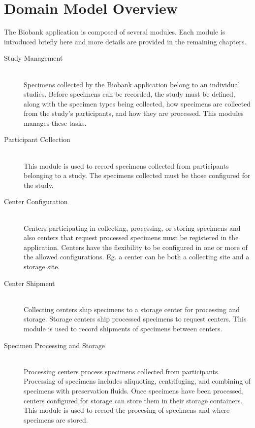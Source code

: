 \chapter{Domain Model Overview}

The Biobank application is composed of several modules. Each module is
introduced briefly here and more details are provided in the remaining
chapters.

\begin{description}

  \item[Study Management] \hfill \\ Specimens collected by the Biobank
    application belong to an individual studies. Before specimens can be
    recorded, the study must be defined, along with the specimen types being
    collected, how specimens are collected from the study's participants, and
    how they are processed. This modules manages these tasks.

  \item[Participant Collection] \hfill \\ This module is used to record
    specimens collected from participants belonging to a study. The specimens
    collected must be those configured for the study.

  \item[Center Configuration] \hfill \\ Centers participating in collecting,
    processing, or storing specimens and also centers that request processed
    specimens must be registered in the application. Centers have the
    flexibility to be configured in one or more of the allowed
    configurations. Eg. a center can be both a collecting site and a storage
    site.

  \item[Center Shipment] \hfill \\ Collecting centers ship specimens to a
    storage center for processing and storage. Storage centers ship processed
    specimens to request centers. This module is used to record shipments of
    specimens between centers.

  \item[Specimen Processing and Storage] \hfill \\ Processing centers process
    specimens collected from participants. Processing of specimens includes
    aliquoting, centrifuging, and combining of specimens with preservation
    fluids.  Once specimens have been processed, centers configured for storage
    can store them in their storage containers. This module is used to record
    the procesing of specimens and where specimens are stored.


\end{description}
